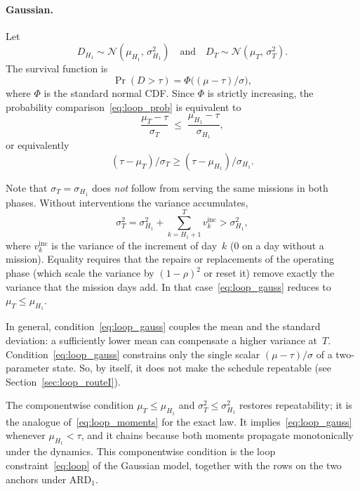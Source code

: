 \documentclass[11pt,a4paper]{article}
\theoremstyle{plain}
\theoremstyle{definition}
\theoremstyle{remark}
\begin{document}
\paragraph{Gaussian.}
Let
\begin{equation}
  D_{H_1} \sim \mathcal{N}(\mu_{H_1},\,\sigma_{H_1}^2)
  \quad\text{and}\quad
  D_T \sim \mathcal{N}(\mu_T,\,\sigma_T^2).
\end{equation}
The survival function is
\begin{equation}
  \Pr(D > \tau) = \Phi\bigl((\mu - \tau)/\sigma\bigr),
\end{equation}
where $\Phi$ is the standard normal CDF.
Since $\Phi$ is strictly increasing, the probability comparison~\eqref{eq:loop_prob} is equivalent to
\begin{equation}\label{eq:loop_gauss}
  \frac{\mu_T - \tau}{\sigma_T} \;\le\; \frac{\mu_{H_1} - \tau}{\sigma_{H_1}},
\end{equation}
or equivalently
\begin{equation}
  (\tau - \mu_T)/\sigma_T \ge (\tau - \mu_{H_1})/\sigma_{H_1}.
\end{equation}

Note that $\sigma_T = \sigma_{H_1}$ does \emph{not} follow from serving the same missions in both phases.
Without interventions the variance accumulates,
\begin{equation}
  \sigma^2_T = \sigma^2_{H_1} + \sum_{k = H_1+1}^{T} v^{\mathrm{inc}}_k > \sigma^2_{H_1},
\end{equation}
where $v^{\mathrm{inc}}_k$ is the variance of the increment of day~$k$ ($0$ on a day without a mission).
Equality requires that the repairs or replacements of the operating phase (which scale the variance by $(1-\rho)^2$ or reset it) remove exactly the variance that the mission days add.
In that case~\eqref{eq:loop_gauss} reduces to $\mu_T \le \mu_{H_1}$.

In general, condition~\eqref{eq:loop_gauss} couples the mean and the standard deviation: a sufficiently lower mean can compensate a higher variance at~$T$.
Condition~\eqref{eq:loop_gauss} constrains only the single scalar $(\mu - \tau)/\sigma$ of a two-parameter state.
So, by itself, it does not make the schedule repeatable (see Section~\ref{sec:loop_routeI}).

The componentwise condition $\mu_T \le \mu_{H_1}$ and $\sigma^2_T \le \sigma^2_{H_1}$ restores repeatability; it is the analogue of~\eqref{eq:loop_moments} for the exact law.
It implies~\eqref{eq:loop_gauss} whenever $\mu_{H_1} < \tau$, and it chains because both moments propagate monotonically under the dynamics.
This componentwise condition is the loop constraint~\eqref{eq:loop} of the Gaussian model, together with the rows on the two anchors under $\text{ARD}_1$.
\end{document}
